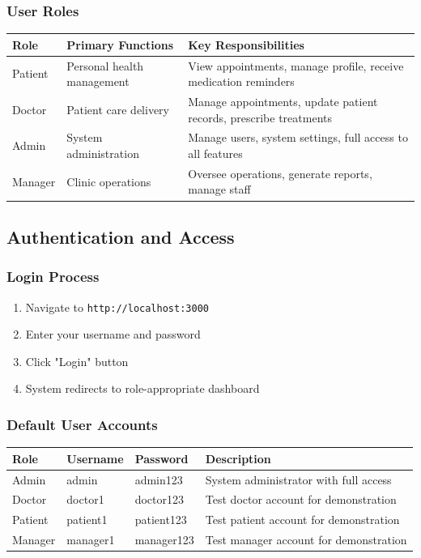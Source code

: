 \documentclass[12pt,a4paper]{article}
\begin{document}
\subsubsection{User Roles}

\begin{longtable}{@{}|p{2cm}|p{4cm}|p{8cm}|@{}}
\hline
\textbf{Role} & \textbf{Primary Functions} & \textbf{Key Responsibilities} \\
\hline
Patient & Personal health management & View appointments, manage profile, receive medication reminders \\
\hline
Doctor & Patient care delivery & Manage appointments, update patient records, prescribe treatments \\
\hline
Admin & System administration & Manage users, system settings, full access to all features \\
\hline
Manager & Clinic operations & Oversee operations, generate reports, manage staff \\
\hline
\end{longtable}

\subsection{Authentication and Access}

\subsubsection{Login Process}

\begin{enumerate}
    \item Navigate to \texttt{http://localhost:3000}
    \item Enter your username and password
    \item Click "Login" button
    \item System redirects to role-appropriate dashboard
\end{enumerate}

\subsubsection{Default User Accounts}

\begin{longtable}{@{}|p{2cm}|p{3cm}|p{3cm}|p{6cm}|@{}}
\hline
\textbf{Role} & \textbf{Username} & \textbf{Password} & \textbf{Description} \\
\hline
Admin & admin & admin123 & System administrator with full access \\
\hline
Doctor & doctor1 & doctor123 & Test doctor account for demonstration \\
\hline
Patient & patient1 & patient123 & Test patient account for demonstration \\
\hline
Manager & manager1 & manager123 & Test manager account for demonstration \\
\hline
\end{longtable}
\end{document}
